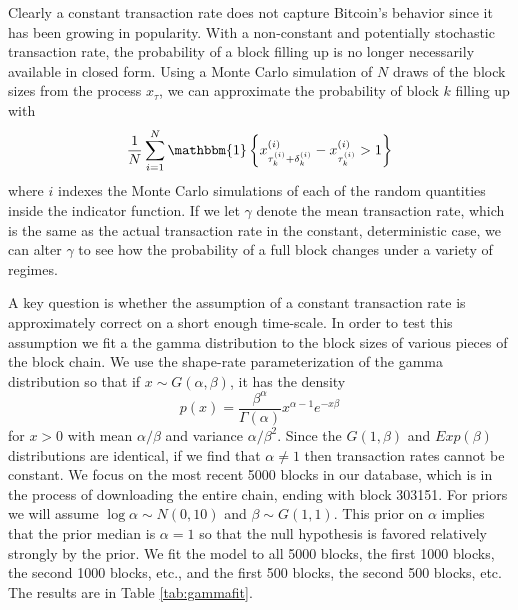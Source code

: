 \documentclass{article}
\begin{document}
Clearly a constant transaction rate does not capture Bitcoin's behavior since it has been growing in popularity. With a non-constant and potentially stochastic transaction rate, the probability of a block filling up is no longer necessarily available in closed form. Using a Monte Carlo simulation of $N$ draws of the block sizes from the process $x_{\tau}$, we can approximate the probability of block $k$ filling up with
\[
\frac{1}{N}\sum_{i=1}^N\mathbbm{1}\left\{x^{(i)}_{\tau_{k}^{(i)}+\delta_k^{(i)}} - x^{(i)}_{\tau_k^{(i)}} > 1\right\}
\]
where $i$ indexes the Monte Carlo simulations of each of the random quantities inside the indicator function. If we let $\gamma$ denote the mean transaction rate, which is the same as the actual transaction rate in the constant, deterministic case, we can alter $\gamma$ to see how the probability of a full block changes under a variety of regimes.

A key question is whether the assumption of a constant transaction rate is approximately correct on a short enough time-scale. In order to test this assumption we fit a the gamma distribution to the block sizes of various pieces of the block chain. We use the shape-rate parameterization of the gamma distribution so that if $x\sim G(\alpha,\beta)$, it has the density
\[
p(x) = \frac{\beta^\alpha}{\Gamma(\alpha)}x^{\alpha-1}e^{-x\beta}
\]
for $x>0$ with mean $\alpha/\beta$ and variance $\alpha/\beta^2$. Since the $G(1,\beta)$ and $Exp(\beta)$ distributions are identical, if we find that $\alpha\neq 1$ then transaction rates cannot be constant. We focus on the most recent 5000 blocks in our database, which is in the process of downloading the entire chain, ending with block 303151.  For priors we will assume $\log \alpha \sim N(0, 10)$ and $\beta \sim G(1, 1)$. This prior on $\alpha$ implies that the prior median is $\alpha=1$ so that the null hypothesis is favored relatively strongly by the prior. We fit the model to all 5000 blocks, the first 1000 blocks, the second 1000 blocks, etc., and the first 500 blocks, the second 500 blocks, etc. The results are in Table \ref{tab:gammafit}. 
\end{document}
